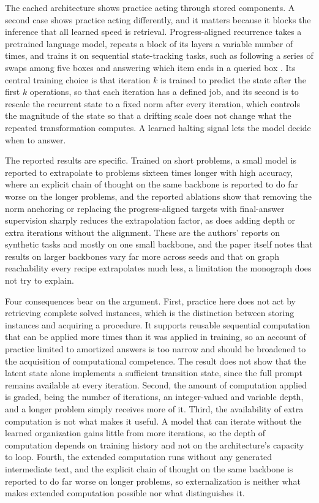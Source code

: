 \documentclass[11pt]{report}
\theoremstyle{remark}
\theoremstyle{definition}
\begin{document}
The cached architecture shows practice acting through stored components. A second case shows practice acting differently, and it matters because it blocks the inference that all learned speed is retrieval. Progress-aligned recurrence takes a pretrained language model, repeats a block of its layers a variable number of times, and trains it on sequential state-tracking tasks, such as following a series of swaps among five boxes and answering which item ends in a queried box \cite{wang2026}. Its central training choice is that iteration $k$ is trained to predict the state after the first $k$ operations, so that each iteration has a defined job, and its second is to rescale the recurrent state to a fixed norm after every iteration, which controls the magnitude of the state so that a drifting scale does not change what the repeated transformation computes. A learned halting signal lets the model decide when to answer.

The reported results are specific. Trained on short problems, a small model is reported to extrapolate to problems sixteen times longer with high accuracy, where an explicit chain of thought on the same backbone is reported to do far worse on the longer problems, and the reported ablations show that removing the norm anchoring or replacing the progress-aligned targets with final-answer supervision sharply reduces the extrapolation factor, as does adding depth or extra iterations without the alignment. These are the authors' reports on synthetic tasks and mostly on one small backbone, and the paper itself notes that results on larger backbones vary far more across seeds and that on graph reachability every recipe extrapolates much less, a limitation the monograph does not try to explain.

Four consequences bear on the argument. First, practice here does not act by retrieving complete solved instances, which is the distinction between storing instances and acquiring a procedure. It supports reusable sequential computation that can be applied more times than it was applied in training, so an account of practice limited to amortized answers is too narrow and should be broadened to the acquisition of computational competence. The result does not show that the latent state alone implements a sufficient transition state, since the full prompt remains available at every iteration. Second, the amount of computation applied is graded, being the number of iterations, an integer-valued and variable depth, and a longer problem simply receives more of it. Third, the availability of extra computation is not what makes it useful. A model that can iterate without the learned organization gains little from more iterations, so the depth of computation depends on training history and not on the architecture's capacity to loop. Fourth, the extended computation runs without any generated intermediate text, and the explicit chain of thought on the same backbone is reported to do far worse on longer problems, so externalization is neither what makes extended computation possible nor what distinguishes it.
\end{document}
